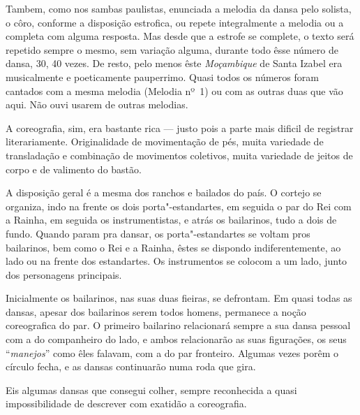 Tambem, como nos sambas paulistas, enunciada a melodia da dansa pelo
solista, o côro, conforme a disposição estrofica, ou repete
integralmente a melodia ou a completa com alguma resposta. Mas desde que
a estrofe se complete, o texto será repetido sempre o mesmo, sem
variação alguma, durante todo êsse número de dansa, 30, 40 vezes. De
resto, pelo menos êste \emph{Moçambique} de Santa Izabel era
musicalmente e poeticamente pauperrimo. Quasi todos os números foram
cantados com a mesma melodia (Melodia nº~1) ou com as outras duas que vão
aqui. Não ouvi usarem de outras melodias.

A coreografia, sim, era bastante rica --- justo pois a parte mais dificil
de registrar literariamente. Originalidade de movimentação de pés, muita
variedade de transladação e combinação de movimentos coletivos, muita
variedade de jeitos de corpo e de valimento do bastão.

A disposição geral é a mesma dos ranchos e bailados do país. O cortejo
se organiza, indo na frente os dois porta"-estandartes, em seguida o par
do Rei com a Rainha, em seguida os instrumentistas, e atrás os
bailarinos, tudo a dois de fundo. Quando param pra dansar, os
porta"-estandartes se voltam pros bailarinos, bem como o Rei e a Rainha,
êstes se dispondo indiferentemente, ao lado ou na frente dos
estandartes. Os instrumentos se colocom a um lado, junto dos personagens
principais.

Inicialmente os bailarinos, nas suas duas fieiras, se defrontam. Em
quasi todas as dansas, apesar dos bailarinos serem todos homens,
permanece a noção coreografica do par. O primeiro bailarino relacionará
sempre a sua dansa pessoal com a do companheiro do lado, e ambos
relacionarão as suas figurações, os seus ``\emph{manejos}'' como êles
falavam, com a do par fronteiro. Algumas vezes porêm o círculo fecha, e
as dansas continuarão numa roda que gira.

Eis algumas dansas que consegui colher, sempre reconhecida a quasi
impossibilidade de descrever com exatidão a coreografia.


